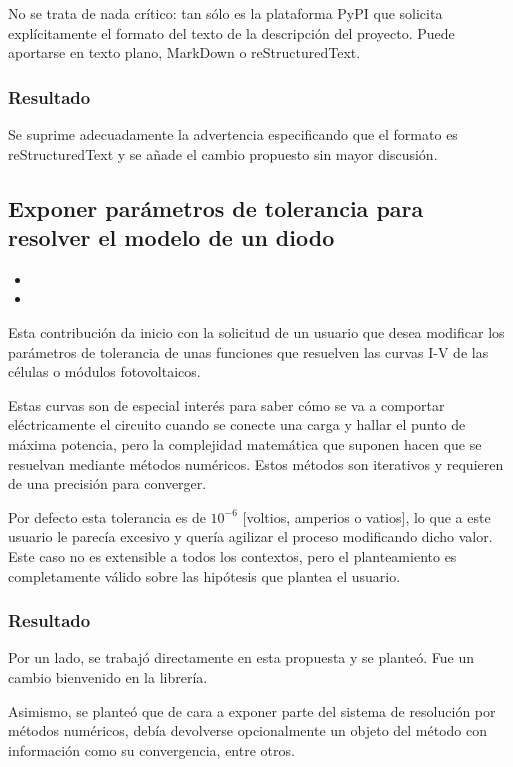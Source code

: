 No se trata de nada crítico: tan sólo es la plataforma PyPI que solicita explícitamente el formato del texto de la descripción del proyecto. Puede aportarse en texto plano, MarkDown o \gls{reStructuredText}.

\subsubsection{Resultado}

Se suprime adecuadamente la advertencia especificando que el formato es reStructuredText y se añade el cambio propuesto sin mayor discusión.

\subsection{Exponer parámetros de tolerancia para resolver el modelo de un diodo}

\begin{itemize}
    \item {}
    \item {}
\end{itemize}

Esta contribución da inicio con la solicitud de un usuario que desea modificar los parámetros de tolerancia de unas funciones que resuelven las curvas I-V de las células o módulos fotovoltaicos.

Estas curvas son de especial interés para saber cómo se va a comportar eléctricamente el circuito cuando se conecte una \gls{carga} y hallar el punto de máxima potencia, pero la complejidad matemática que suponen hacen que se resuelvan mediante métodos numéricos. Estos métodos son iterativos y requieren de una precisión para converger.

Por defecto esta tolerancia es de $10^{-6}$ [voltios, amperios o vatios], lo que a este usuario le parecía excesivo y quería agilizar el proceso modificando dicho valor. Este caso no es extensible a todos los contextos, pero el planteamiento es completamente válido sobre las hipótesis que plantea el usuario.

\subsubsection{Resultado}

Por un lado, se trabajó directamente en esta propuesta y se planteó. Fue un cambio bienvenido en la librería.

Asimismo, se planteó que de cara a exponer parte del sistema de resolución por métodos numéricos, debía devolverse opcionalmente un objeto del método con información como su convergencia, entre otros.

